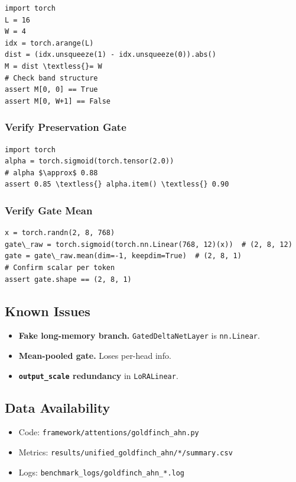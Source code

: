\begin{lstlisting}
import torch
L = 16
W = 4
idx = torch.arange(L)
dist = (idx.unsqueeze(1) - idx.unsqueeze(0)).abs()
M = dist \textless{}= W
# Check band structure
assert M[0, 0] == True
assert M[0, W+1] == False
\end{lstlisting}

\subsubsection{Verify Preservation Gate}

\begin{lstlisting}
import torch
alpha = torch.sigmoid(torch.tensor(2.0))
# alpha $\approx$ 0.88
assert 0.85 \textless{} alpha.item() \textless{} 0.90
\end{lstlisting}

\subsubsection{Verify Gate Mean}

\begin{lstlisting}
x = torch.randn(2, 8, 768)
gate\_raw = torch.sigmoid(torch.nn.Linear(768, 12)(x))  # (2, 8, 12)
gate = gate\_raw.mean(dim=-1, keepdim=True)  # (2, 8, 1)
# Confirm scalar per token
assert gate.shape == (2, 8, 1)
\end{lstlisting}

\subsection{Known Issues}

\begin{itemize}
\item \textbf{Fake long-memory branch.} \texttt{GatedDeltaNetLayer} is \texttt{nn.Linear}.
\item \textbf{Mean-pooled gate.} Loses per-head info.
\item \textbf{\texttt{output\_scale} redundancy} in \texttt{LoRALinear}.

\end{itemize}
\subsection{Data Availability}

\begin{itemize}
\item Code: \texttt{framework/attentions/goldfinch\_ahn.py}
\item Metrics: \texttt{results/unified\_goldfinch\_ahn/*/summary.csv}
\item Logs: \texttt{benchmark\_logs/goldfinch\_ahn\_*.log}

\end{itemize}


